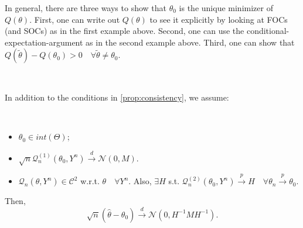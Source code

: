 In general, there are three ways to show that $\theta_0$ is the unique minimizer of $Q(\theta)$.
First, one can write out $Q(\theta)$ to see it explicitly by looking at FOCs (and SOCs) as in the first example
above. Second, one can use the conditional-expectation-argument as in the second example
above. Third, one can show that $Q(\tilde{\theta}) - Q(\theta_0) > 0 \quad \forall \tilde{\theta} \neq \theta_0$.

\begin{proposition}
    \
    
    In addition to the conditions in \ref{prop:consistency}, we assume:
    \begin{assumption}
        \

        \begin{itemize}
            \item $\theta_0 \in int(\Theta)$;
            \item $\sqrt{n} \mathcal{Q}_n^{(1)}(\theta_0, Y^n) \overset{d}{\rightarrow} \mathcal{N}(0, M)$.
            \item $\mathcal{Q}_n(\theta, Y^n) \in \mathcal{C}^2$ w.r.t. $\theta\quad \forall Y^n$.
            Also, $\exists H$ s.t. $\mathcal{Q}_n^{(2)}(\theta_0, Y^n) \overset{p}{\rightarrow}H \quad \forall \theta_n \overset{p}{\rightarrow}\theta_0$.
        \end{itemize}
    \end{assumption}
    Then,
    \[
    \sqrt{n}(\hat{\theta} - \theta_0) \overset{d}{\rightarrow} \mathcal{N}(0, H^{-1} M H^{-1}).
    \]
\end{proposition}

